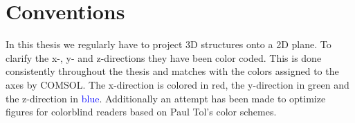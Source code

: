 \chapter*{Conventions}
\label{chap:conventions}
In this thesis we regularly have to project 3D structures onto a 2D plane. To clarify the x-, y- and z-directions they have been color coded. This is done consistently throughout the thesis and matches with the colors assigned to the axes by COMSOL. The x-direction is colored in \textcolor{x_axis_color}{red}, the y-direction in \textcolor{y_axis_color}{green} and the z-direction in \textcolor{blue}{blue}. Additionally an attempt has been made to optimize figures for colorblind readers based on Paul Tol's color schemes\cite{paul_tol}.
